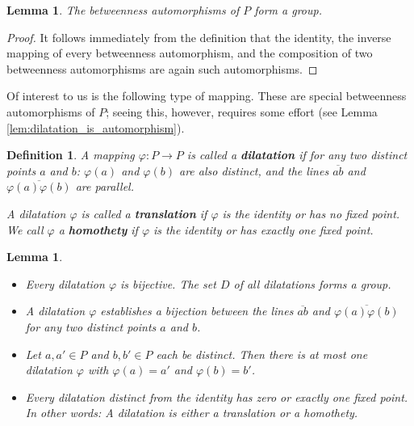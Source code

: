 \documentclass[11pt,a4paper]{article}
\newcommand{\lineab}[1]{\overline{#1}}
\newtheorem{lemma}[theorem]{Lemma}
\newtheorem{definition}[theorem]{Definition}
\begin{document}
\begin{lemma} \label{lem:automorphism_group}
The betweenness automorphisms of $P$ form a group.
\end{lemma}
\begin{proof}
It follows immediately from the definition that the identity, the inverse mapping of every betweenness automorphism, and the composition of two betweenness automorphisms are again such automorphisms.
\end{proof}

Of interest to us is the following type of mapping. These are special betweenness automorphisms of $P$; seeing this, however, requires some effort (see Lemma \ref{lem:dilatation_is_automorphism}).

\begin{definition} \label{def:dilatation}
A mapping $\varphi: P \to P$ is called a \textbf{dilatation} if for any two distinct points $a$ and $b$: $\varphi(a)$ and $\varphi(b)$ are also distinct, and the lines $\lineab{ab}$ and $\lineab{\varphi(a)\varphi(b)}$ are parallel.

A dilatation $\varphi$ is called a \textbf{translation} if $\varphi$ is the identity or has no fixed point. We call $\varphi$ a \textbf{homothety} if $\varphi$ is the identity or has exactly one fixed point.
\end{definition}

\begin{lemma} \label{lem:dilatation_properties}
\begin{itemize}
    \item[(i)] Every dilatation $\varphi$ is bijective. The set $D$ of all dilatations forms a group.
    \item[(ii)] A dilatation $\varphi$ establishes a bijection between the lines $\lineab{ab}$ and $\lineab{\varphi(a)\varphi(b)}$ for any two distinct points $a$ and $b$.
    \item[(iii)] Let $a, a' \in P$ and $b, b' \in P$ each be distinct. Then there is at most one dilatation $\varphi$ with $\varphi(a) = a'$ and $\varphi(b) = b'$.
    \item[(iv)] Every dilatation distinct from the identity has zero or exactly one fixed point. In other words: A dilatation is either a translation or a homothety.
\end{itemize}
\end{lemma}
\end{document}

